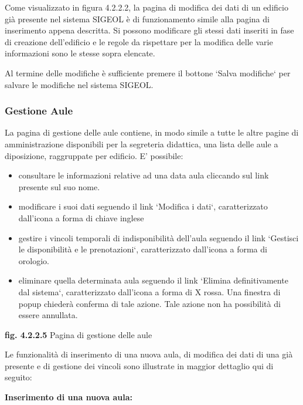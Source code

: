 \documentclass[11pt,a4paper]{article}
\begin{document}
Come visualizzato in figura 4.2.2.2, la pagina di modifica dei dati di un edificio già presente nel sistema SIGEOL è di funzionamento simile alla pagina di inserimento appena descritta. Si possono modificare gli stessi dati inseriti in fase di creazione dell'edificio e le regole da rispettare per la modifica delle varie informazioni sono le stesse sopra elencate.

Al termine delle modifiche è sufficiente premere il bottone `Salva modifiche` per salvare le modifiche nel sistema SIGEOL.
\subsubsection{Gestione Aule}
La pagina di gestione delle aule contiene, in modo simile a tutte le altre pagine di amministrazione disponibili per la segreteria didattica, una lista delle aule a diposizione, raggruppate per edificio.
E' possibile:
\begin{itemize}
 \item consultare le informazioni relative ad una data aula cliccando sul link presente sul suo nome.
 \item modificare i suoi dati seguendo il link `Modifica i dati`, caratterizzato dall'icona a forma di chiave inglese
 \item gestire i vincoli temporali di indisponibilità dell'aula seguendo il link `Gestisci le disponibilità e le prenotazioni`, caratterizzato dall'icona a forma di orologio.
 \item eliminare quella determinata aula seguendo il link `Elimina definitivamente dal sistema`, caratterizzato dall'icona a forma di X rossa. Una finestra di popup chiederà conferma di tale azione. Tale azione non ha possibilità di essere annullata.
\end{itemize}

\bigskip
\begin{center}
	\textbf{fig. 4.2.2.5} Pagina di gestione delle aule\\
\end{center}
\bigskip

Le funzionalità di inserimento di una nuova aula, di modifica dei dati di una già presente e di gestione dei vincoli sono illustrate in maggior dettaglio qui di seguito:
\newline \newline
\begin{large}\textbf{Inserimento di una nuova aula:}\end{large}
\end{document}
